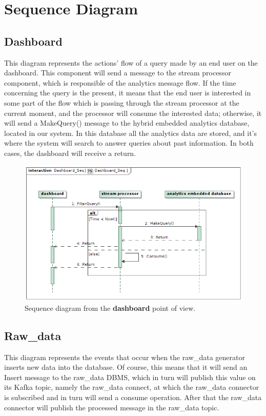 \section{Sequence Diagram}

\subsection{Dashboard}

This diagram represents the actions' flow of a query made by an end user on the dashboard. This component will send a message to the stream processor component, which is responsible of the analytics message flow. If the time concerning the query is the present, it means that the end user is interested in some part of the flow which is passing through the stream processor at the current moment, and the processor will consume the interested data; otherwise, it will send a MakeQuery() message to the hybrid embedded analytics database, located in our system. In this database all the analytics data are stored, and it's where the system will search to answer queries about past information.
In both cases, the dashboard will receive a return.


\begin{figure}[H]
\centering
\includegraphics[width=\textwidth]{img/Dashboard_Seq.png}
\caption{Sequence diagram from the \textbf{dashboard} point of view.}
\end{figure}

\subsection{Raw\_data}
This diagram represents the events that occur when the raw\_data generator inserts new data into the database. Of course, this means that it will send an Insert message to the raw\_data DBMS, which in turn will publish this value on its Kafka topic, namely the raw\_data connect, at which the raw\_data connector is subscribed and in turn will send a consume operation. After that the raw\_data connector will publish the processed message in the raw\_data topic.

